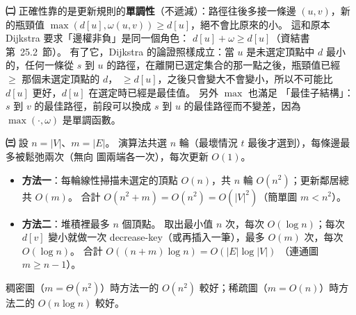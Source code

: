 \begin{pastsoln}
\textbf{㈡} 正確性靠的是更新規則的\textbf{單調性}（不遞減）：路徑往後多接一條邊 $(u, v)$，新的瓶頸值
$\max(d[u], \omega(u, v)) \ge d[u]$，絕不會比原來的小。 這和原本 Dijkstra 要求「邊權非負」是同一個角色：
$d[u] + \omega \ge d[u]$（資結書第~25.2~節）。 有了它，Dijkstra 的論證照樣成立：當 $u$ 是未選定頂點中 $d$ 最小
的，任何一條從 $s$ 到 $u$ 的路徑，在離開已選定集合的那一點之後，瓶頸值已經 $\ge$ 那個未選定頂點的 $d$，
$\ge d[u]$，之後只會變大不會變小，所以不可能比 $d[u]$ 更好，$d[u]$ 在選定時已經是最佳值。 另外 $\max$ 也滿足
「最佳子結構」：$s$ 到 $v$ 的最佳路徑，前段可以換成 $s$ 到 $u$ 的最佳路徑而不變差，因為 $\max(\cdot, \omega)$
是單調函數。

\textbf{㈢} 設 $n = |V|$、$m = |E|$。 演算法共選 $n$ 輪（最壞情況 $t$ 最後才選到），每條邊最多被鬆弛兩次（無向
圖兩端各一次），每次更新 $O(1)$。
\begin{itemize}
\item \textbf{方法一}：每輪線性掃描未選定的頂點 $O(n)$，共 $n$ 輪 $O(n^2)$；更新鄰居總共 $O(m)$。 合計
$O(n^2 + m) = O(n^2) = O(|V|^2)$（簡單圖 $m < n^2$）。
\item \textbf{方法二}：堆積裡最多 $n$ 個頂點。 取出最小值 $n$ 次，每次 $O(\log n)$；每次 $d[v]$ 變小就做一次
decrease-key（或再插入一筆），最多 $O(m)$ 次，每次 $O(\log n)$。 合計 $O((n + m)\log n) = O(|E| \log |V|)$
（連通圖 $m \ge n - 1$）。
\end{itemize}
稠密圖（$m = \Theta(n^2)$）時方法一的 $O(n^2)$ 較好；稀疏圖（$m = O(n)$）時方法二的 $O(n \log n)$ 較好。
\end{pastsoln}
